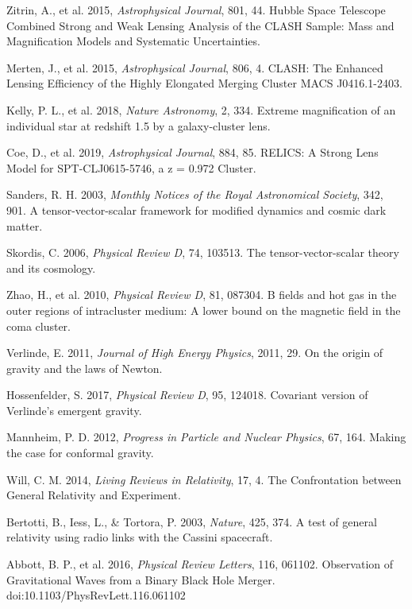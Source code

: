 \documentclass[fleqn,usenatbib]{mnras}
\begin{document}
\begin{thebibliography}{99}
 Zitrin, A., et al. 2015, \textit{Astrophysical Journal}, 801, 44. Hubble Space Telescope Combined Strong and Weak Lensing Analysis of the CLASH Sample: Mass and Magnification Models and Systematic Uncertainties.

 Merten, J., et al. 2015, \textit{Astrophysical Journal}, 806, 4. CLASH: The Enhanced Lensing Efficiency of the Highly Elongated Merging Cluster MACS J0416.1-2403.

 Kelly, P. L., et al. 2018, \textit{Nature Astronomy}, 2, 334. Extreme magnification of an individual star at redshift 1.5 by a galaxy-cluster lens.

 Coe, D., et al. 2019, \textit{Astrophysical Journal}, 884, 85. RELICS: A Strong Lens Model for SPT-CLJ0615-5746, a z = 0.972 Cluster.

 Sanders, R. H. 2003, \textit{Monthly Notices of the Royal Astronomical Society}, 342, 901. A tensor-vector-scalar framework for modified dynamics and cosmic dark matter.

 Skordis, C. 2006, \textit{Physical Review D}, 74, 103513. The tensor-vector-scalar theory and its cosmology.

 Zhao, H., et al. 2010, \textit{Physical Review D}, 81, 087304. B fields and hot gas in the outer regions of intracluster medium: A lower bound on the magnetic field in the coma cluster.

 Verlinde, E. 2011, \textit{Journal of High Energy Physics}, 2011, 29. On the origin of gravity and the laws of Newton.

 Hossenfelder, S. 2017, \textit{Physical Review D}, 95, 124018. Covariant version of Verlinde's emergent gravity.

 Mannheim, P. D. 2012, \textit{Progress in Particle and Nuclear Physics}, 67, 164. Making the case for conformal gravity.

 Will, C. M. 2014, \textit{Living Reviews in Relativity}, 17, 4. The Confrontation between General Relativity and Experiment.

 Bertotti, B., Iess, L., \& Tortora, P. 2003, \textit{Nature}, 425, 374. A test of general relativity using radio links with the Cassini spacecraft.

 Abbott, B. P., et al. 2016, \textit{Physical Review Letters}, 116, 061102. Observation of Gravitational Waves from a Binary Black Hole Merger. doi:10.1103/PhysRevLett.116.061102


\end{thebibliography}
\end{document}
